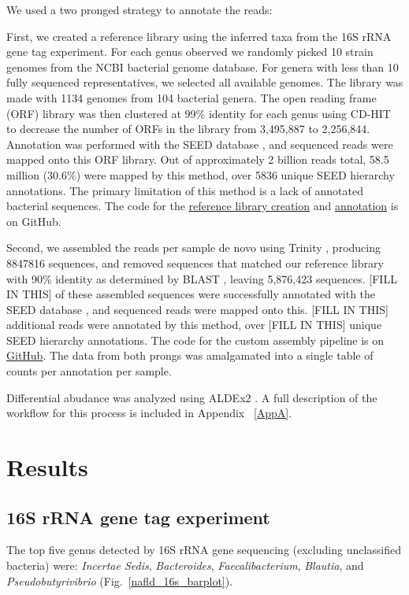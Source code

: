 We used a two pronged strategy to annotate the reads:

First, we created a reference library using the inferred taxa from the 16S rRNA gene tag experiment. For each genus observed we randomly picked 10 strain genomes from the NCBI bacterial genome database. For genera with less than 10 fully sequenced representatives, we selected all available genomes. The library was made with 1134 genomes from 104 bacterial genera. The open reading frame (ORF) library was then clustered at 99\% identity for each genus using CD-HIT \cite{li2006cd} to decrease the number of ORFs in the library from 3,495,887 to 2,256,844. Annotation was performed with the SEED database \cite{overbeek2005subsystems}, and sequenced reads were mapped onto this ORF library. Out of approximately 2 billion reads total, 58.5 million (30.6\%) were mapped by this method, over 5836 unique SEED hierarchy annotations. The primary limitation of this method is a lack of annotated bacterial sequences. The code for the \href{https://github.com/ruthgrace/make_functional_mapping_library}{reference library creation} and \href{https://github.com/ruthgrace/mapping_library_annotated_counts}{annotation} is on GitHub.

Second, we assembled the reads per sample de novo using Trinity \cite{haas2013novo}, producing 8847816 sequences, and removed sequences that matched our reference library with 90\% identity as determined by BLAST \cite{altschul1990basic}, leaving 5,876,423 sequences. [FILL IN THIS] of these assembled sequences were successfully annotated with the SEED database \cite{overbeek2005subsystems}, and sequenced reads were mapped onto this. [FILL IN THIS] additional reads were annotated by this method, over [FILL IN THIS] unique SEED hierarchy annotations. The code for the custom assembly pipeline is on \href{https://github.com/ruthgrace/exploring_nafld_assembly}{GitHub}. The data from both prongs was amalgamated into a single table of counts per annotation per sample.

Differential abudance was analyzed using ALDEx2 \cite{fernandes2014unifying}. A full description of the workflow for this process is included in Appendix ~\ref{AppA}.

\FloatBarrier

\section{Results}

\subsection{16S rRNA gene tag experiment}
The top five genus detected by 16S rRNA gene sequencing (excluding unclassified bacteria) were: \textit{Incertae Sedis}, \textit{Bacteroides}, \textit{Faecalibacterium}, \textit{Blautia}, and \textit{Pseudobutyrivibrio} (Fig.~\ref{nafld_16s_barplot}).


